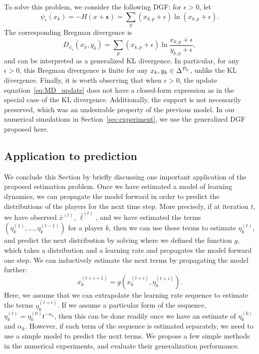\documentclass{sig-alternate-ipsn13}
\begin{document}
To solve this problem, we consider the following DGF: for $\epsilon > 0$, let
\[
\psi_\epsilon(x_k) = -H(x+\mathbf \epsilon) = \sum_p (x_{k, p} + \epsilon) \ln (x_{k,p} + \epsilon).
\]
The corresponding Bregman divergence is
\[
D_{\psi_\epsilon}(x_k, y_k) = \sum_p (x_{k,p}+\epsilon)\ln\frac{x_{k, p} + \epsilon}{y_{k, p} + \epsilon},
\]
and can be interpreted as a generalized KL divergence. In particular, for any $\epsilon > 0$, this Bregman divergence is finite for any $x_k, y_k \in \Delta^{\mathcal{P}_k}$, unlike the KL divergence. Finally, it is worth observing that when $\epsilon > 0$, the update equation~\eqref{eq:MD_update} does not have a closed-form expression as in the special case of the KL divergence. Additionally, the support is not necessarily preserved, which was an undesirable property of the previous model. In our numerical simulations in Section~\ref{sec:experiment}, we use the generalized DGF proposed here.




\subsection{Application to prediction}
We conclude this Section by briefly discussing one important application of the proposed estimation problem. Once we have estimated a model of learning dynamics, we can propagate the model forward in order to predict the distributions of the players for the next time step. More precisely, if at iteration $t$, we have observed $\bar x^{(t)}$, $\bar \ell^{(t)}$, and we have estimated the terms $(\eta_k^{(1)}, \dots, \eta_k^{(t-1)})$ for a player $k$, then we can use these terms to estimate $\eta_k^{(t)}$, and predict the next distribution by solving
where we defined the function $g$, which takes a distribution and a learning rate and propagates the model forward one step. We can inductively estimate the next terms by propagating the model further:
\[
x_k^{(t+i+1)} = g(x^{(t+i)}_k, \eta_k^{(t+i)}).
\]
Here, we assume that we can extrapolate the learning rate sequence to estimate the terms $\eta_k^{(t+i)}$. If we assume a particular form of the sequence, $\eta_k^{(t)} = \eta_k^{(0)} t^{-\alpha_k}$, then this can be done readily once we have an estimate of $\eta_k^{(0)}$ and $\alpha_k$. However, if each term of the sequence is estimated separately, we need to use a simple model to predict the next terms. We propose a few simple methods in the numerical experiments, and evaluate their generalization performance.
\end{document}
